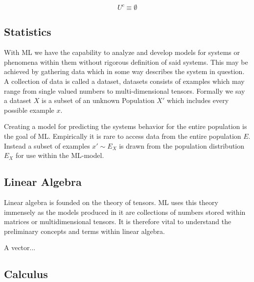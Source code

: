 \begin{equation}
\label{eqnuniverseC}
U^c  \equiv \emptyset
\end{equation}



\subsection{Statistics}

With ML we have the capability to analyze and develop models for systems or phenomena within them without rigorous definition of said systems. This may be achieved by gathering data which in some way describes the system in question. A collection of data is called a dataset, datasets consists of examples which may range from single valued numbers to multi-dimensional tensors. Formally we say a dataset $X$ is a subset of an unknown Population $X'$ which includes every possible example $x$.


Creating a model for predicting the systems behavior for the entire population is the goal of ML. Empirically it is rare to access data from the entire population $E$. Instead a subset of examples $x' \sim E_{X}$ is drawn from the population distribution $E_{X}$ for use within the ML-model. 

\subsection{Linear Algebra}

Linear algebra is founded on the theory of tensors. ML uses this theory immensely as the models produced in it are collections of numbers stored within matrices or multidimensional tensors. It is therefore vital to understand the preliminary concepts and terms within linear algebra.

A vector...

\subsection{Calculus}

